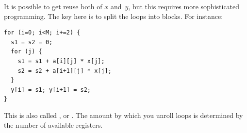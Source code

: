 It is possible to get reuse both of $x$ and~$y$, but this requires
more sophisticated programming. The key here is to split the loops into
blocks. For instance:
\begin{lstlisting}
for (i=0; i<M; i+=2) {
  s1 = s2 = 0;
  for (j) {
    s1 = s1 + a[i][j] * x[j];
    s2 = s2 + a[i+1][j] * x[j];
  }
  y[i] = s1; y[i+1] = s2;
}
\end{lstlisting}
This is also called ,
or . The amount by which you unroll
loops is determined by the number of available registers.





\endinput

C clock()

gettimeofday, getrusage

very accurate counters

PAPI, TAU
